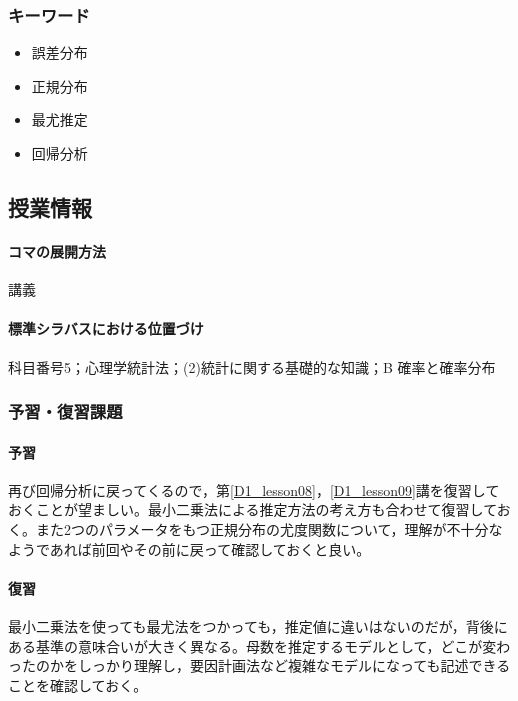 \subsubsection{キーワード}
\begin{itemize}
\item 誤差分布
\item 正規分布
\item 最尤推定
\item 回帰分析
\end{itemize}
\subsection{授業情報}
\paragraph{コマの展開方法}
講義
\paragraph{標準シラバスにおける位置づけ}
科目番号5；心理学統計法；(2)統計に関する基礎的な知識；B 確率と確率分布
\subsubsection{予習・復習課題}
\paragraph{予習}
再び回帰分析に戻ってくるので，第\ref{D1_lesson08}，\ref{D1_lesson09}講を復習しておくことが望ましい。最小二乗法による推定方法の考え方も合わせて復習しておく。また2つのパラメータをもつ正規分布の尤度関数について，理解が不十分なようであれば前回やその前に戻って確認しておくと良い。
\paragraph{復習}
最小二乗法を使っても最尤法をつかっても，推定値に違いはないのだが，背後にある基準の意味合いが大きく異なる。母数を推定するモデルとして，どこが変わったのかをしっかり理解し，要因計画法など複雑なモデルになっても記述できることを確認しておく。
